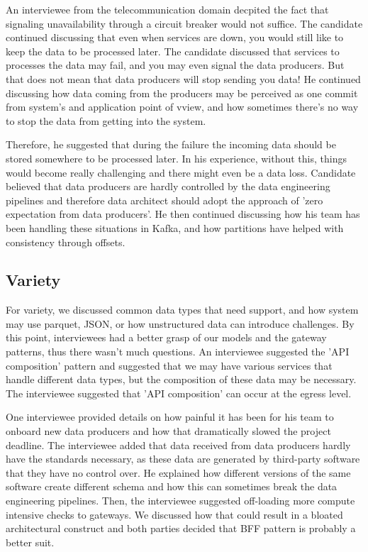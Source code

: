 \documentclass{bmcart}
\begin{document}
An interviewee from the telecommunication domain decpited the fact that signaling unavailability through a circuit breaker would not suffice. The candidate continued discussing that even when services are down, you would still like to keep the data to be processed later. The candidate discussed that services to processes the data may fail, and you may even signal the data producers. But that does not mean that data producers will stop sending you data! He continued discussing how data coming from the producers may be perceived as one commit from system's and application point of vview, and how sometimes there's no way to stop the data from getting into the system. 

Therefore, he suggested that during the failure the incoming data should be stored somewhere to be processed later. In his experience, without this, things would become really challenging and there might even be a data loss. Candidate believed that data producers are hardly controlled by the data engineering pipelines and therefore data architect should adopt the approach of 'zero expectation from data producers'. He then continued discussing how his team has been handling these situations in Kafka, and how partitions have helped with consistency through offsets. 


\subsection{Variety}

For variety, we discussed common data types that need support, and how system may use parquet, JSON, or how unstructured data can introduce challenges. By this point, interviewees had a better grasp of our models and the gateway patterns, thus there wasn't much questions. An interviewee suggested the 'API composition' pattern and suggested that we may have various services that handle different data types, but the composition of these data may be necessary. The interviewee suggested that 'API composition' can occur at the egress level. 

One interviewee provided details on how painful it has been for his team to onboard new data producers and how that dramatically slowed the project deadline. The interviewee added that data received from data producers hardly have the standards necessary, as these data are generated by third-party software that they have no control over. He explained how different versions of the same software create different schema and how this can sometimes break the data engineering pipelines. Then, the interviewee suggested off-loading more compute intensive checks to gateways. We discussed how that could result in a bloated architectural construct and both parties decided that BFF pattern is probably a better suit.  
\end{document}
